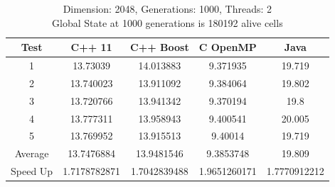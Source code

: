 \documentclass[11pt]{article} %
\begin{document}
\begin{table}[ht]

\caption{Dimension: 2048, Generations: 1000, Threads: 2\\Global State at 1000 generations is 180192 alive cells} %

\centering %

\begin{tabular}{c c c c c} %

\hline\hline %

Test & C++ 11 & C++ Boost & C OpenMP & Java \\ [0.5ex] %


\hline %

1 & 13.73039 & 14.013883 & 9.371935 & 19.719 \\
2 & 13.740023 & 13.911092 & 9.384064 & 19.802 \\
3 & 13.720766 & 13.941342 & 9.370194 & 19.8 \\
4 & 13.777311 & 13.958943 & 9.400541 & 20.005 \\
5 & 13.769952 & 13.915513 & 9.40014 & 19.719 \\
Average & 13.7476884 & 13.9481546 & 9.3853748 & 19.809 \\
Speed Up & 1.7178782871 & 1.7042839488 & 1.9651260171 & 1.7770912212 \\ [1ex]




\hline %

\end{tabular}
\end{table}
\end{document}
